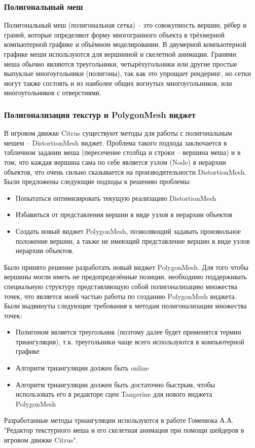 \documentclass{fefu}
\begin{document}
\subsubsection{Полигональный меш}
Полигональный меш (полигональная сетка) -- это совокупность вершин, рёбер и граней, которые определяют форму 
многогранного объекта в трёхмерной компьютерной графике и объёмном моделировании. В двумерной компьютерной графике 
меши используются для вершинной и скелетной анимации. Гранями меша обычно являются треугольники, 
четырёхугольники или другие простые выпуклые многоугольники (полигоны), так как это упрощает рендеринг, но сетки могут 
также состоять и из наиболее общих вогнутых многоугольников, или многоугольников с отверстиями.
\subsubsection{Полигонализация текстур и PolygonMesh виджет}
В игровом движке Citrus существуют методы для работы с полигональным мешем --
DistortionMesh виджет. Проблема такого подхода заключается в табличном задании меша (пересечение столбца и строки --
вершина меша) и в том, что каждая вершина сама по себе является узлом (Node) в иерархии объектов, что очень сильно сказывается на
производительности DistortionMesh. Были предложены следующие подходы к решению проблемы:
\begin{itemize}
    \item Попытаться оптимизировать текущую реализацию DistortionMesh
    \item Избавиться от представления вершин в виде узлов в иерархии объектов
    \item Создать новый виджет PolygonMesh, позволяющий задавать произвольное положение вершин, а также не имеющий 
    представление вершин в виде узлов иерархии объектов.
\end{itemize}
Было принято решение разработать новый виджет PolygonMesh. Для того чтобы вершины могли
иметь не предопределённые позиции, необходимо поддерживать специальную структуру представляющую собой
полигонализацию множества точек, что является моей частью работы по созданию PolygonMesh виджета. Были выдвинуты
следующие требования к методам полигонализации множества точек:
\begin{itemize}
    \item Полигоном является треугольник (поэтому далее будет применятся термин триангуляция), т.к.
треугольники чаще всего используются в компьютерной графике
    \item Алгоритм триангуляции должен быть online
    \item Алгоритм триангуляции должен быть достаточно быстрым, чтобы использовать его в редакторе сцен
    Tangerine для нового виджета PolygonMesh
\end{itemize}
Разработанные методы триангуляции используются в работе Гоменюка А.А. "Редактор текстурного меша и его скелетная анимация
при помощи шейдеров в игровом движке Citrus".
\end{document}
